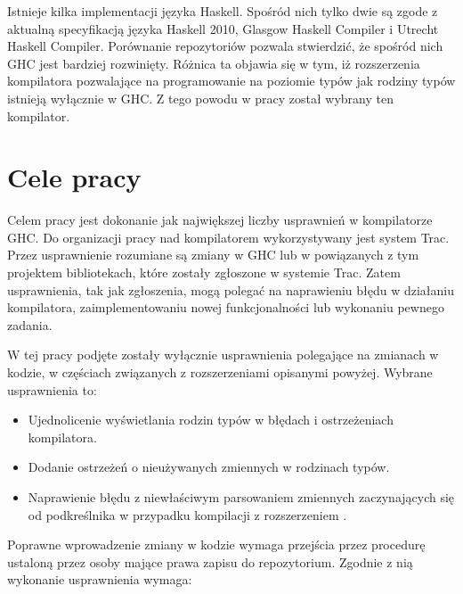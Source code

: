 Istnieje kilka implementacji języka Haskell. Spośród nich tylko dwie są zgode z aktualną specyfikacją języka Haskell 2010, Glasgow Haskell Compiler i Utrecht Haskell Compiler\cite{WikiImplementations}. Porównanie repozytoriów pozwala stwierdzić, że spośród nich GHC jest bardziej rozwinięty. Różnica ta objawia się w tym, iż rozszerzenia kompilatora pozwalające na programowanie na poziomie typów jak rodziny typów istnieją wyłącznie w GHC\cite{UHCUserGuide}. Z tego powodu w pracy został wybrany ten kompilator.


\section{Cele pracy}\label{sec:cele_pracy}

Celem pracy jest dokonanie jak największej liczby usprawnień w kompilatorze GHC. Do organizacji pracy nad kompilatorem wykorzystywany jest system Trac. Przez usprawnienie rozumiane są zmiany w GHC lub w powiązanych z tym projektem bibliotekach, które zostały zgłoszone w systemie Trac. Zatem usprawnienia, tak jak zgłoszenia, mogą polegać na naprawieniu błędu w działaniu kompilatora, zaimplementowaniu nowej funkcjonalności lub wykonaniu pewnego zadania.

W tej pracy podjęte zostały wyłącznie usprawnienia polegające na zmianach w kodzie, w częściach związanych z rozszerzeniami opisanymi powyżej. Wybrane usprawnienia to:

\begin{itemize}
 \item Ujednolicenie wyświetlania rodzin typów w błędach i ostrzeżeniach kompilatora.
 \item Dodanie ostrzeżeń o nieużywanych zmiennych w rodzinach typów.
 \item Naprawienie błędu z niewłaściwym parsowaniem zmiennych zaczynających się od podkreślnika w przypadku kompilacji z rozszerzeniem .
\end{itemize}

Poprawne wprowadzenie zmiany w kodzie wymaga przejścia przez procedurę ustaloną przez osoby mające prawa zapisu do repozytorium\cite{WikiFixingBugs}. Zgodnie z nią wykonanie usprawnienia wymaga:

